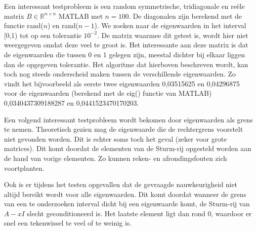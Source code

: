 Een interessant testprobleem is een random symmetrische, tridiagonale en re\"ele matrix $B \in \mathbb{R}^{n \times n}$ MATLAB met $n = 100$. De diagonalen zijn berekend met de functie rand($n$) en rand($n-1$). We zoeken naar de eigenwaarden in het interval [0,1) tot op een tolerantie $10^{-2}$. De matrix waarmee dit getest is, wordt hier niet weergegeven omdat deze veel te groot is. Het interessante aan deze matrix is dat de eigenwaarden die tussen 0 en 1 gelegen zijn, meestal dichter bij elkaar liggen dan de opgegeven tolerantie. Het algoritme dat hierboven beschreven wordt, kan toch nog steeds onderscheid maken tussen de verschillende eigenwaarden. Zo vindt het bijvoorbeeld als eerste twee eigenwaarden 0,03515625 en 0,04296875 voor de eigenwaarden (berekend met de eig() functie van MATLAB) 0,0340437309188287 en 0,0441523470170203.

Een volgend interessant testprobleem wordt bekomen door eigenwaarden als grens te nemen. Theoretisch gezien mag de eigenwaarde die de rechtergrens voorstelt niet gevonden worden. Dit is echter soms toch het geval (zeker voor grote matrices). Dit komt doordat de elementen van de Sturm-rij opgesteld worden aan de hand van vorige elementen. Zo kunnen reken- en afrondingsfouten zich voortplanten.

Ook is er tijdens het testen opgevallen dat de gevraagde nauwkeurigheid niet altijd bereikt wordt voor alle eigenwaarden. Dit komt doordat wanneer de grens van een te onderzoeken interval dicht bij een eigenwaarde komt, de Sturm-rij van $A-xI$ slecht geconditioneerd is. Het laatste element ligt dan rond 0, waardoor er snel een tekenwissel te veel of te weinig is.